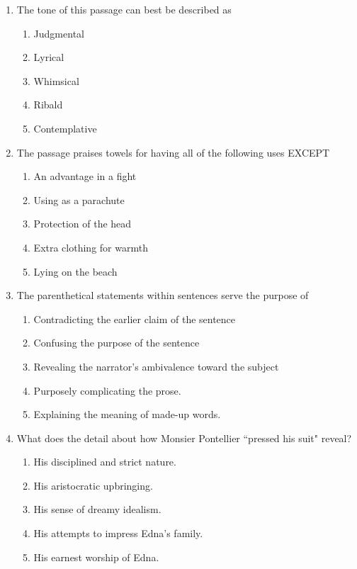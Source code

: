 \bigskip
\begin{enumerate}
\item The tone of this passage can best be described as 

\begin{enumerate}[label=(\Alph*)]
\item Judgmental
\item Lyrical
\item Whimsical
\item Ribald
\item Contemplative
\end{enumerate}

\bigskip
\item The passage praises towels for having all of the following uses EXCEPT
\begin{enumerate}[label=(\Alph*)]
\item An advantage in a fight
\item Using as a parachute
\item Protection of the head
\item Extra clothing for warmth
\item Lying on the beach
\end{enumerate}

\newpage
\item The parenthetical statements within sentences serve the purpose of
\begin{enumerate}[label=(\Alph*)]
\item Contradicting the earlier claim of the sentence
\item Confusing the purpose of the sentence
\item Revealing the narrator's ambivalence toward the subject
\item Purposely complicating the prose.
\item Explaining the meaning of made-up words.
\end{enumerate}

\bigskip
\item What does the detail about how Monsier Pontellier ``pressed his suit" reveal?
\begin{enumerate}[label=(\Alph*)]
\item His disciplined and strict nature.
\item His aristocratic upbringing.
\item His sense of dreamy idealism.
\item His attempts to impress Edna's family.
\item His earnest worship of Edna.
\end{enumerate}
\end{enumerate}


